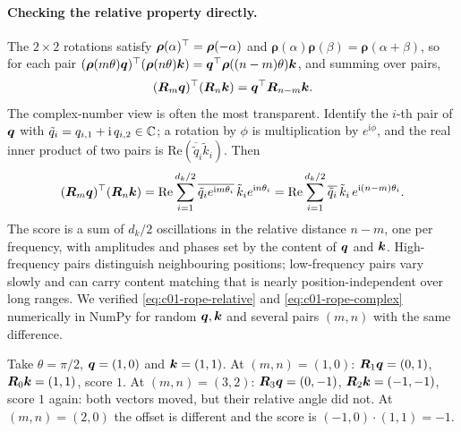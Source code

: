 \paragraph{Checking the relative property directly.} The $2\times 2$ rotations satisfy
$\bm{\rho}(\alpha)^{\top} = \bm{\rho}(-\alpha)$ and $\bm{\rho}(\alpha)\bm{\rho}(\beta) =
\bm{\rho}(\alpha+\beta)$, so for each pair
$(\bm{\rho}(m\theta)\bm{q})^{\top}(\bm{\rho}(n\theta)\bm{k}) = \bm{q}^{\top}\bm{\rho}((n-m)\theta)\bm{k}$, and summing
over pairs,
\begin{equation}\label{eq:c01-rope-relative}
  (\bm{R}_m\bm{q})^{\top}(\bm{R}_n\bm{k}) = \bm{q}^{\top}\bm{R}_{n-m}\bm{k} .
\end{equation}
The complex-number view is often the most transparent. Identify the $i$-th pair of $\bm{q}$
with $\tilde{q}_i = q_{i,1} + \mathrm{i}\,q_{i,2} \in \mathbb{C}$; a rotation by $\phi$ is
multiplication by $e^{\mathrm{i}\phi}$, and the real inner product of two pairs is
$\mathrm{Re}(\overline{\tilde{q}}_i\tilde{k}_i)$. Then
\begin{equation}\label{eq:c01-rope-complex}
  (\bm{R}_m\bm{q})^{\top}(\bm{R}_n\bm{k})
  = \mathrm{Re}\sum_{i=1}^{d_k/2}\overline{\tilde{q}_i e^{\mathrm{i}m\theta_i}}\,\tilde{k}_i e^{\mathrm{i}n\theta_i}
  = \mathrm{Re}\sum_{i=1}^{d_k/2}\overline{\tilde{q}_i}\,\tilde{k}_i\,e^{\mathrm{i}(n-m)\theta_i}.
\end{equation}
The score is a sum of $d_k/2$ oscillations in the relative distance $n - m$, one per
frequency, with amplitudes and phases set by the content of $\bm{q}$ and $\bm{k}$. High-frequency
pairs distinguish neighbouring positions; low-frequency pairs vary slowly and can carry
content matching that is nearly position-independent over long ranges. We verified
\eqref{eq:c01-rope-relative} and \eqref{eq:c01-rope-complex} numerically in NumPy for random
$\bm{q}, \bm{k}$ and several pairs $(m, n)$ with the same difference.

\begin{example}[RoPE with $d_k = 2$]\label{ex:c01-rope}
Take $\theta = \pi/2$, $\bm{q} = (1, 0)$ and $\bm{k} = (1, 1)$. At $(m, n) = (1, 0)$:
$\bm{R}_1\bm{q} = (0, 1)$, $\bm{R}_0\bm{k} = (1, 1)$, score $1$. At $(m, n) = (3, 2)$:
$\bm{R}_3\bm{q} = (0, -1)$, $\bm{R}_2\bm{k} = (-1, -1)$, score $1$ again: both vectors moved,
but their relative angle did not. At $(m, n) = (2, 0)$ the offset is different and the score
is $(-1, 0)\cdot(1, 1) = -1$.
\end{example}

